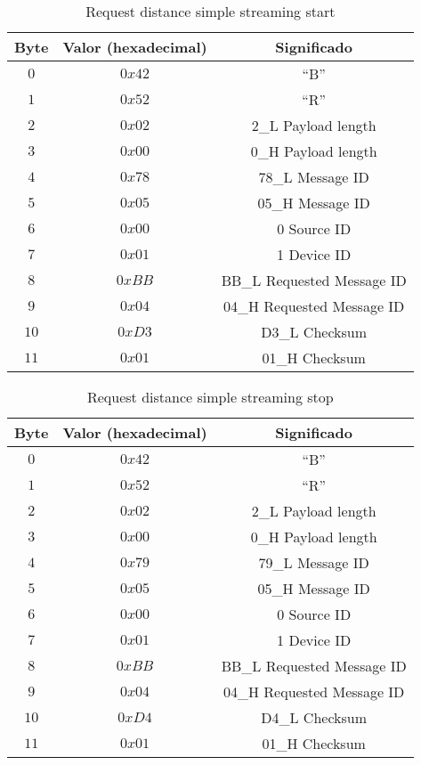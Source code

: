 \begin{table}[h]
	\centering
	\caption{Request distance simple streaming start}
	\begin{tabular}{|c|c|c|}
		\hline
		\textbf{Byte}	&\textbf{Valor (hexadecimal)} &\textbf{Significado} \\ \hline  \hline
		$0$		&$0x42$		& ``B'' \\ \hline
		$1$		&$0x52$		& ``R'' \\ \hline
		$2$		&$0x02$		& 2\_L Payload length \\ \hline
		$3$		&$0x00$		& 0\_H Payload length \\ \hline
		$4$		&$0x78$		& 78\_L Message ID \\ \hline
		$5$		&$0x05$		& 05\_H Message ID \\ \hline
		$6$		&$0x00$		& 0    Source ID \\ \hline 
		$7$		&$0x01$		& 1    Device ID \\ \hline
		$8$		&$0xBB$		& BB\_L Requested Message ID \\ \hline
		$9$		&$0x04$		& 04\_H Requested Message ID\\ \hline  
		$10$	&$0xD3$		& D3\_L Checksum\\ \hline   
		$11$	&$0x01$		& 01\_H Checksum\\ \hline  
	\end{tabular}
	\label{tab:4}
\end{table}

\begin{table}[h]
	\centering
	\caption{Request distance simple streaming stop}
	\begin{tabular}{|c|c|c|}
		\hline
		\textbf{Byte}	&\textbf{Valor (hexadecimal)} &\textbf{Significado} \\ \hline  \hline
		$0$		&$0x42$		& ``B'' \\ \hline
		$1$		&$0x52$		& ``R'' \\ \hline
		$2$		&$0x02$		& 2\_L Payload length \\ \hline
		$3$		&$0x00$		& 0\_H Payload length \\ \hline
		$4$		&$0x79$		& 79\_L Message ID \\ \hline
		$5$		&$0x05$		& 05\_H Message ID \\ \hline
		$6$		&$0x00$		& 0    Source ID \\ \hline 
		$7$		&$0x01$		& 1    Device ID \\ \hline
		$8$		&$0xBB$		& BB\_L Requested Message ID \\ \hline
		$9$		&$0x04$		& 04\_H Requested Message ID\\ \hline  
		$10$	&$0xD4$		& D4\_L Checksum\\ \hline   
		$11$	&$0x01$		& 01\_H Checksum\\ \hline  
	\end{tabular}
	\label{tab:5}
\end{table}

